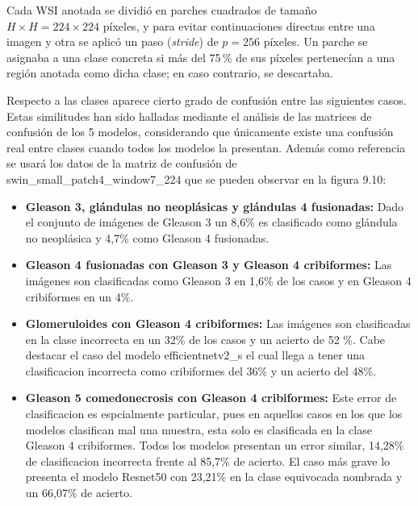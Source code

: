 Cada WSI anotada se dividió en parches cuadrados de tamaño $H \times H = 224 \times 224$ píxeles, y para evitar continuaciones directas entre una imagen y otra
se aplicó un paso (\emph{stride}) de $p = 256$ píxeles. Un parche se asignaba a una clase concreta si más del 75\,\% de sus píxeles pertenecían a una región anotada como dicha clase; en caso contrario, se descartaba.


Respecto a las clases aparece cierto grado de confusión entre las siguientes casos. Estas similitudes han sido halladas mediante el análisis de las matrices de confusión de los 5 modelos, considerando que únicamente existe una confusión real entre clases cuando todos los modelos la presentan. Además como referencia se usará los datos de la matriz de confusión de swin\_small\_patch4\_window7\_224 que se pueden observar en la figura 9.10:
\begin{itemize}
  \item \textbf{Gleason 3, glándulas no neoplásicas y glándulas 4 fusionadas:} Dado el conjunto de imágenes de Gleason 3 un 8,6\%  es clasificado como glándula no neoplásica y 4,7\% como Gleason 4 fusionadas.
  \item \textbf{Gleason 4 fusionadas con Gleason 3 y Gleason 4 cribiformes:} Las imágenes son clasificadas como Gleason 3 en 1,6\% de los casos y en Gleason 4 cribiformes en un 4\%.
  \item \textbf{Glomeruloides con Gleason 4 cribiformes:} Las imágenes son clasificadas en la clase incorrecta en un 32\% de los casos y un acierto de 52 \%. Cabe destacar el caso del modelo efficientnetv2\_s el cual llega a tener una clasificacion incorrecta como cribiformes del 36\% y un acierto del 48\%.
  \item \textbf{Gleason 5 comedonecrosis con Gleason 4 cribiformes:} Este error de clasificacion es espcialmente particular, pues en aquellos casos en los que los modelos clasifican mal una muestra, esta solo es clasificada en la clase Gleason 4 cribiformes. Todos los modelos presentan un error similar, 14,28\% de clasificacion incorrecta frente al 85,7\% de acierto. El caso más grave lo presenta el modelo Resnet50 con 23,21\% en la clase equivocada nombrada y un 66,07\% de acierto.
\end{itemize}

